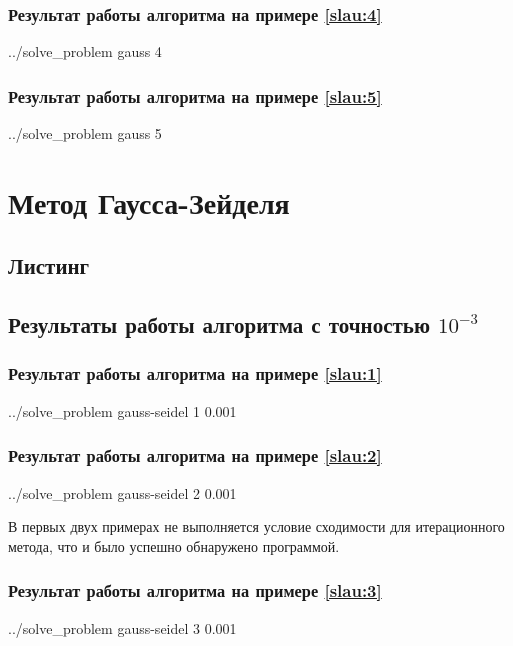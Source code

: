 \documentclass[a4paper]{article}
\begin{document}
\subsubsection{Результат работы алгоритма на примере \eqref{slau:4}}
\bash[stdout]
../solve_problem gauss 4
\END

\subsubsection{Результат работы алгоритма на примере \eqref{slau:5}}
\bash[stdout]
../solve_problem gauss 5
\END

\break

\section{Метод Гаусса-Зейделя}

\subsection{Листинг}


\subsection{Результаты работы алгоритма с точностью $10^{-3}$}

\subsubsection{Результат работы алгоритма на примере \eqref{slau:1}}
\bash[stdout]
../solve_problem gauss-seidel 1 0.001
\END
\newline

\subsubsection{Результат работы алгоритма на примере \eqref{slau:2}}
\bash[stdout]
../solve_problem gauss-seidel 2 0.001
\END

В первых двух примерах не выполняется условие сходимости для итерационного метода, что и было успешно обнаружено программой.

\subsubsection{Результат работы алгоритма на примере \eqref{slau:3}}
\bash[stdout]
../solve_problem gauss-seidel 3 0.001
\END
\end{document}

